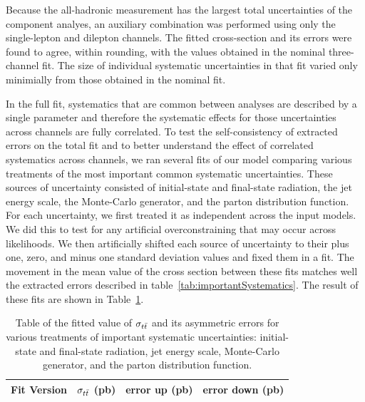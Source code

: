 Because the all-hadronic measurement has the largest total uncertainties of the component analyes, an auxiliary combination was performed using only the single-lepton and dilepton channels.
The fitted cross-section and its errors were found to agree, within rounding, with the values obtained in the nominal three-channel fit.
The size of individual systematic uncertainties in that fit varied only minimially from those obtained in the nominal fit.

In the full fit, systematics that are common between analyses are described by a single parameter and therefore the systematic effects for those uncertainties across channels are fully correlated.
To test the self-consistency of extracted errors on the total fit and to better understand the effect of correlated systematics across channels, 
we ran several fits of our model comparing various treatments of the most important common systematic uncertainties.
These sources of uncertainty consisted of initial-state and final-state radiation, the jet energy scale, the Monte-Carlo generator, and the parton distribution function.
For each uncertainty, we first treated it as independent across the input models.  
We did this to test for any artificial overconstraining that may occur across likelihoods.
We then artificially shifted each source of uncertainty to their plus one, zero, and minus one standard deviation values and fixed them in a fit. 
The movement in the mean value of the cross section between these fits matches well the extracted errors described in table~\ref{tab:importantSystematics}.
The result of these fits are shown in Table~\ref{tab:SystematicDecorrelation}. 

\begin{table}[htbp]

  \begin{center}
    \begin{tabular}{|c|ccc|}
      \hline
      Fit Version & $\sigma_{t\bar{t}}$ (pb) & error up (pb) & error down (pb)  \\
      \hline
      \hline
      
      \hline
    \end{tabular}
  \end{center}
  \caption{ \label{tab:SystematicDecorrelation} Table of the fitted value of $\sigma_{ t\bar{t} }$ and its asymmetric errors for various treatments of important systematic uncertainties: initial-state and final-state radiation, jet energy scale, Monte-Carlo generator, and the parton distribution function.   }
\end{table}


